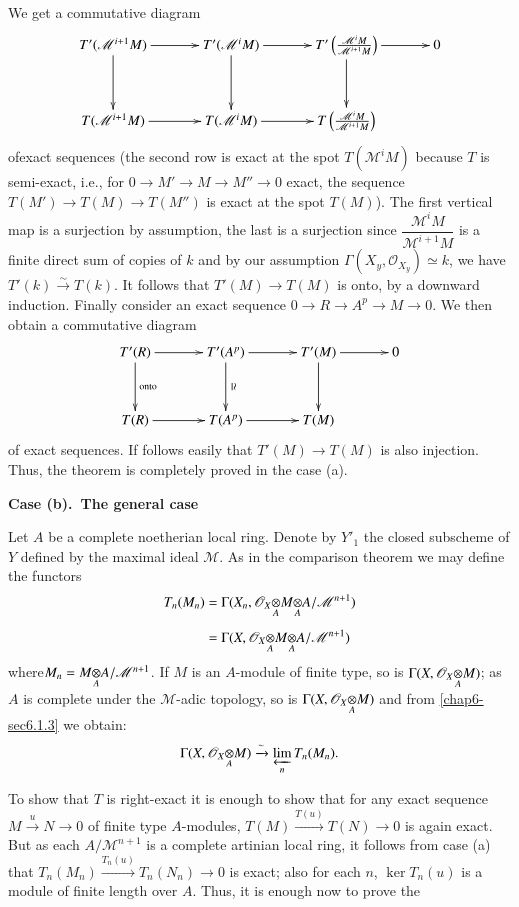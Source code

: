 We get a commutative diagram
\[
\xymatrix@=1.2cm{
T'(\mathscr{M}^{i+1}M)\ar[r]\ar[d] & T'(\mathscr{M}^{i}M)\ar[d]\ar[r]
&
T'\left(\frac{\mathscr{M}^{i}M}{\mathscr{M}^{i+1}M}\right)\ar[d]\ar[r]
&0 \\
T(\mathscr{M}^{i+1}M)\ar[r] & T(\mathscr{M}^{i}M)\ar[r] &
T\left(\frac{\mathscr{M}^{i}M}{\mathscr{M}^{i+1}M}\right) & 
}
\]
of\pageoriginale exact sequences (the second row is exact at the spot
$T(\mathscr{M}^{i}M)$ because $T$ is semi-exact, i.e., for $0\to M'\to
M\to M''\to 0$ exact, the sequence $T(M')\to T(M)\to T(M'')$ is exact
at the spot $T(M)$). The first vertical map is a surjection by
assumption, the last is a surjection since
$\dfrac{\mathscr{M}^{i}M}{\mathscr{M}^{i+1}M}$ is a finite direct sum
of copies of $k$ and by our assumption
$\Gamma(X_{y},\mathscr{O}_{X_{y}})\simeq k$, we have
$T'(k)\xrightarrow{\sim}T(k)$. It follows that $T'(M)\to T(M)$ is
onto, by a downward induction. Finally consider an exact sequence
$0\to R\to A^{p}\to M\to 0$. We then obtain a commutative diagram 
\[
\xymatrix@=1.2cm{
T'(R)\ar[r]\ar[d]^{\text{onto}} & T'(A^{p})\ar[d]^{\rotatebox{-90}{$\simeq$}}\ar[r] &
T'(M)\ar[d]\ar[r] & 0\\
T(R)\ar[r] & T(A^{p})\ar[r] & T(M) &
}
\]
of exact sequences. If follows easily that $T'(M)\to T(M)$ is also
injection. Thus, the theorem is completely proved in the case (a).

\medskip
{\bf Case (b).~The general case}
\smallskip

Let $A$ be a complete noetherian local ring. Denote by $Y'_{1}$ the
closed subscheme of $Y$ defined by the maximal ideal $\mathscr{M}$. As
in the comparison theorem we may define the functors
\begin{align*}
T_{n}(M_{n}) &=
\Gamma(X_{n},\foprod{\mathscr{O}_{X}}{\foprod{M}{A/\mathscr{M}^{n+1}}{A}}{A})\\[5pt] 
&= \Gamma(X,\foprod{\mathscr{O}_{X}}{\foprod{M}{A/\mathscr{M}^{n+1}}{A}}{A})
\end{align*}
where\pageoriginale $M_{n}=\foprod{M}{A/\mathscr{M}^{n+1}}{A}$. If $M$
is an $A$-module of finite type, so is
$\Gamma(X,\foprod{\mathscr{O}_{X}}{M}{A})$; as $A$ is complete under
the $\mathscr{M}$-adic topology, so is
$\Gamma(X,\foprod{\mathscr{O}_{X}}{M}{A})$ and from \ref{chap6-sec6.1.3} we
obtain: 
$$
\Gamma(X,\foprod{\mathscr{O}_{X}}{M}{A})\xrightarrow{\sim}\varprojlim_{n}T_{n}(M_{n}). 
$$

To show that $T$ is right-exact it is enough to show that for any
exact sequence $M\xrightarrow{u}N\to 0$ of finite type $A$-modules,
$T(M)\xrightarrow{T(u)}T(N)\to 0$ is again exact. But as each
$A/\mathscr{M}^{n+1}$ is a complete artinian local ring, it follows
from case (a) that $T_{n}(M_{n})\xrightarrow{T_{n}(u)}T_{n}(N_{n})\to
0$ is exact; also for each $n$, $\ker T_{n}(u)$ is a module of finite
length over $A$. Thus, it is enough now to prove the

